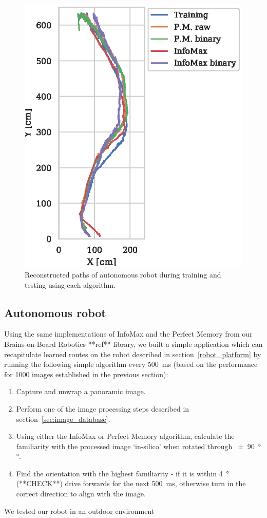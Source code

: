 \documentclass[letterpaper]{article}
\begin{document}
\begin{figure}[t]
    \centering
    \includegraphics{figures/robot_paths.eps}
    \caption{Reconstructed paths of autonomous robot during training and testing using each algorithm.}
    \label{robot_paths}
\end{figure}


\subsection{Autonomous robot}
Using the same implementations of InfoMax and the Perfect Memory from our Brains-on-Board Robotics **ref** library, we built a simple application which can recapitulate learned routes on the robot described in section~\ref{robot_platform} by running the following simple algorithm every \SI{500}{\milli\second} (based on the performance for 1000 images established in the previous section):
\begin{enumerate}
    \item Capture and unwrap a panoramic image.
    \item Perform one of the image processing steps described in section~\ref{sec:image_database}.
    \item Using either the InfoMax or Perfect Memory algorithm, calculate the familiarity with the processed image ‘in-silico’ when rotated through \SI{\pm 90}{\degree}°.
    \item Find the orientation with the highest familiarity - if it is within \SI{4}{\degree} (**CHECK**) drive forwards for the next \SI{500}{\milli\second}, otherwise turn in the correct direction to align with the image.
\end{enumerate}
We tested our robot in an outdoor environment 
\end{document}
